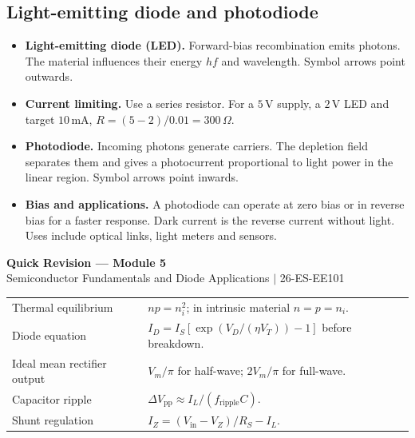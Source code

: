 \documentclass[12pt,a4paper]{article}
\renewcommand{\arraystretch}{1.45}
\begin{document}
\subsection{Light-emitting diode and photodiode}
\begin{itemize}[leftmargin=*, itemsep=3pt, topsep=4pt]
  \item \textbf{Light-emitting diode (LED).} Forward-bias recombination emits photons. The material influences their energy \(hf\) and wavelength. Symbol arrows point outwards.
  \item \textbf{Current limiting.} Use a series resistor. For a \(5\,\mathrm V\) supply, a \(2\,\mathrm V\) LED and target \(10\,\mathrm{mA}\), \(R=(5-2)/0.01=300\,\Omega\).
  \item \textbf{Photodiode.} Incoming photons generate carriers. The depletion field separates them and gives a photocurrent proportional to light power in the linear region. Symbol arrows point inwards.
  \item \textbf{Bias and applications.} A photodiode can operate at zero bias or in reverse bias for a faster response. Dark current is the reverse current without light. Uses include optical links, light meters and sensors.
\end{itemize}



\newpage
\begin{center}
  {\large\bfseries\color{myred} Quick Revision --- Module 5}\\[3pt]
  {\small\color{mydark} Semiconductor Fundamentals and Diode Applications $|$ 26-ES-EE101}
\end{center}
\noindent{\color{myred}\rule{\linewidth}{1.2pt}}
\vspace{4pt}

\begin{tcolorbox}[formulabox, title={Key Formulas and Concepts at a Glance}]
\renewcommand{\arraystretch}{1.35}
\begin{tabularx}{\linewidth}{B{4.4cm}Y}
Thermal equilibrium & $np=n_i^2$; in intrinsic material $n=p=n_i$. \\[3pt]
Diode equation & $I_D=I_S[\exp(V_D/(\eta V_T))-1]$ before breakdown. \\[3pt]
Ideal mean rectifier output & $V_m/\pi$ for half-wave; $2V_m/\pi$ for full-wave. \\[3pt]
Capacitor ripple & $\Delta V_{\mathrm{pp}}\approx I_L/(f_{\mathrm{ripple}}C)$. \\[3pt]
Shunt regulation & $I_Z=(V_{\mathrm{in}}-V_Z)/R_S-I_L$. \\[3pt]
\end{tabularx}
\end{tcolorbox}
\end{document}
